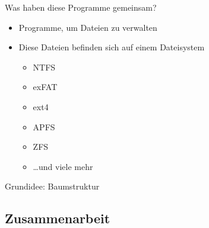 \begin{frame}
    \slidehead
    \begin{center}
        
        \hspace{2em}
        
        \hspace{2em}
        
        \hspace{2em}
        

        \vspace{1em}
        Was haben diese Programme gemeinsam?
    \end{center}

    \vspace{1ex}
    \pause
    \begin{itemize}
        [<+->]
        \item Programme, um Dateien zu verwalten
        \item Diese Dateien befinden sich auf einem Dateisystem
        \begin{itemize}
            \item NTFS
            \item exFAT
            \item ext4
            \item APFS
            \item ZFS
            \item \dots und viele mehr
        \end{itemize}
    \end{itemize}
\end{frame}

\begin{frame}
    \slidehead
    Grundidee: Baumstruktur
    \\
    \vspace{1em}
    \begin{center}
    \end{center}
\end{frame}

\subsection{Zusammenarbeit}\label{subsec:zusammenarbeit}

